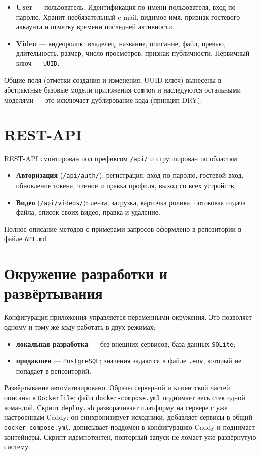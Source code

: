 \begin{itemize}
  \item \textbf{User} — пользователь. Идентификация по имени
        пользователя, вход по паролю. Хранит необязательный e-mail,
        видимое имя, признак гостевого аккаунта и отметку времени
        последней активности.
  \item \textbf{Video} — видеоролик: владелец, название, описание,
        файл, превью, длительность, размер, число просмотров, признак
        публичности. Первичный ключ — \texttt{UUID}.
\end{itemize}

Общие поля (отметки создания и изменения, UUID-ключ) вынесены в
абстрактные базовые модели приложения \texttt{common} и наследуются
остальными моделями — это исключает дублирование кода (принцип DRY).

\section{REST-API}

REST-API смонтирован под префиксом \texttt{/api/} и сгруппирован по
областям:

\begin{itemize}
  \item \textbf{Авторизация} (\texttt{/api/auth/}): регистрация, вход по
        паролю, гостевой вход, обновление токена, чтение и правка
        профиля, выход со всех устройств.
  \item \textbf{Видео} (\texttt{/api/videos/}): лента, загрузка,
        карточка ролика, потоковая отдача файла, список своих видео,
        правка и удаление.
\end{itemize}

Полное описание методов с примерами запросов оформлено в репозитории в
файле \texttt{API.md}.

\section{Окружение разработки и развёртывания}

Конфигурация приложения управляется переменными окружения. Это
позволяет одному и тому же коду работать в двух режимах:
\begin{itemize}
  \item \textbf{локальная разработка} — без внешних сервисов, база
        данных \texttt{SQLite};
  \item \textbf{продакшен} — \texttt{PostgreSQL}; значения задаются в
        файле \texttt{.env}, который не попадает в репозиторий.
\end{itemize}

Развёртывание автоматизировано. Образы серверной и клиентской частей
описаны в \texttt{Dockerfile}; файл \texttt{docker-compose.yml}
поднимает весь стек одной командой. Скрипт \texttt{deploy.sh}
разворачивает платформу на сервере с уже настроенным Caddy: он
синхронизирует исходники, добавляет сервисы в общий
\texttt{docker-compose.yml}, дописывает поддомен в конфигурацию Caddy и
поднимает контейнеры. Скрипт идемпотентен, повторный запуск не ломает
уже развёрнутую систему.

\endinput
